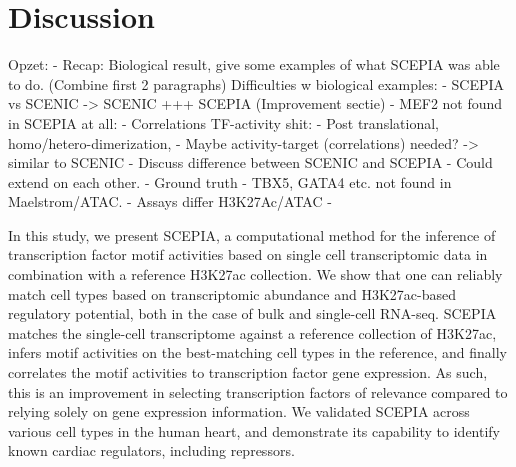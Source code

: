 \section{Discussion}

Opzet:
- Recap: Biological result, give some examples of what SCEPIA was able to do. (Combine first 2 paragraphs)
Difficulties w biological examples: 
- SCEPIA vs SCENIC -> SCENIC +++ SCEPIA (Improvement sectie)
    - MEF2 not found in SCEPIA at all: 
    - Correlations TF-activity shit: 
    - Post translational, homo/hetero-dimerization, 
    - Maybe activity-target (correlations) needed? -> similar to SCENIC
    - Discuss difference between SCENIC and SCEPIA
    - Could extend on each other.
- Ground truth
    - TBX5, GATA4 etc. not found in Maelstrom/ATAC.
    - Assays differ H3K27Ac/ATAC
    - 



In this study, we present SCEPIA, a computational method for the inference of transcription factor motif activities based on single cell transcriptomic data in combination with a reference H3K27ac collection. We show that one can reliably match cell types based on transcriptomic abundance and H3K27ac-based regulatory potential\cite{Wang2016}, both in the case of bulk and single-cell RNA-seq. SCEPIA matches the single-cell transcriptome against a reference collection of H3K27ac, infers motif activities on the best-matching cell types in the reference, and finally correlates the motif activities to transcription factor gene expression. As such, this is an improvement in selecting transcription factors of relevance compared to relying solely on gene expression information. We validated SCEPIA across various cell types in the human heart, and demonstrate its capability to identify known cardiac regulators, including repressors. 

